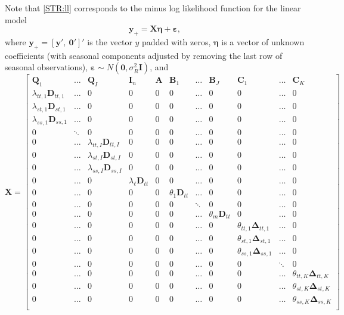 \documentclass[11pt,a4paper,]{article}
\begin{document}
Note that \eqref{STR:ll} corresponds to the minus log likelihood function for the linear model
\begin{equation}
  \label{STR:linear_model}
  \bm{y}_{+} = \bm{X}\bm{\eta} + \bm{\varepsilon} ,
\end{equation}
where \(\bm{y}_{+} = [\bm{y}',~ \bm{0}']'\) is the vector \(y\) padded with zeros,
\(\bm{\eta}\) is a vector of unknown coefficients (with seasonal components adjusted by removing the last row of seasonal observations),
\(\bm{\varepsilon} \sim N(\bm{0},\sigma_R^2\bm{I})\),
and
\begin{equation}
  \label{regr:X}
  \bm{X} =
  \begin{bmatrix}
 \bm{Q}_1 & \dots & \bm{Q}_I & \bm{I}_n & \bm{A} & \bm{B}_1 & \dots & \bm{B}_J & \bm{C}_1 & \dots & \bm{C}_K \\
 \lambda_{tt,1} \bm{D}_{tt,1} & \dots & 0 & 0 & 0 & 0 & \dots & 0 & 0 & \dots & 0 \\
 \lambda_{st,1} \bm{D}_{st,1} & \dots & 0 & 0 & 0 & 0 & \dots & 0 & 0 & \dots & 0 \\
 \lambda_{ss,1} \bm{D}_{ss,1} & \dots & 0 & 0 & 0 & 0 & \dots & 0 & 0 & \dots & 0 \\
 0 & \ddots & 0 & 0 & 0 & 0 & \dots & 0 & 0 & \dots & 0 \\
 0 & \dots & \lambda_{tt,I} \bm{D}_{tt,I} & 0 & 0 & 0 & \dots & 0 & 0 & \dots & 0\\
 0 & \dots & \lambda_{st,I} \bm{D}_{st,I} & 0 & 0 & 0 & \dots & 0 & 0 & \dots & 0 \\
 0 & \dots & \lambda_{ss,I} \bm{D}_{ss,I} & 0 & 0 & 0 & \dots & 0 & 0 & \dots & 0 \\
 0 & \dots & 0 & \lambda_\ell \bm{D}_{tt} & 0 & 0 & \dots & 0 & 0 & \dots & 0 \\
 0 & \dots & 0 & 0 & 0 & \theta_1 \bm{D}_{tt} & \dots & 0 & 0 & \dots & 0 \\
 0 & \dots & 0 & 0 & 0 & 0 & \ddots & 0 & 0 & \dots & 0 \\
 0 & \dots & 0 & 0 & 0 & 0 & \dots & \theta_m \bm{D}_{tt} & 0 & \dots & 0 \\
 0 & \dots & 0 & 0 & 0 & 0 & \dots & 0 & \theta_{tt,1} \bm{\Delta}_{tt,1} & \dots & 0 \\
 0 & \dots & 0 & 0 & 0 & 0 & \dots & 0 & \theta_{st,1} \bm{\Delta}_{st,1} & \dots & 0 \\
 0 & \dots & 0 & 0 & 0 & 0 & \dots & 0 & \theta_{ss,1} \bm{\Delta}_{ss,1} & \dots & 0 \\
 0 & \dots & 0 & 0 & 0 & 0 & \dots & 0 & 0 & \ddots & 0 \\
 0 & \dots & 0 & 0 & 0 & 0 & \dots & 0 & 0 & \dots & \theta_{tt,K} \bm{\Delta}_{tt,K} \\
 0 & \dots & 0 & 0 & 0 & 0 & \dots & 0 & 0 & \dots & \theta_{st,K} \bm{\Delta}_{st,K} \\
 0 & \dots & 0 & 0 & 0 & 0 & \dots & 0 & 0 & \dots & \theta_{ss,K} \bm{\Delta}_{ss,K} \\
  \end{bmatrix}
\end{equation}
\end{document}

